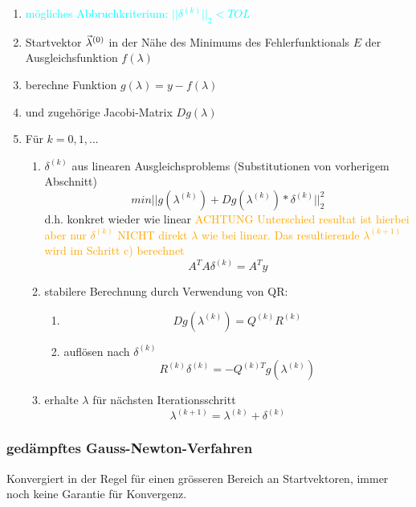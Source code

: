{\large
\begin{enumerate}
	\item[] \textcolor{cyan}{mögliches Abbruchkriterium: $||\delta^{(k)}||_2 < TOL$}
	\item Startvektor $\vec \lambda^{(0)}$ in der Nähe des Minimums des
	      Fehlerfunktionals $E$ der Ausgleichsfunktion $f(\lambda)$
	\item berechne Funktion $g(\lambda) = y - f(\lambda)$
	\item und zugehörige Jacobi-Matrix $Dg(\lambda)$
	\item Für $k = 0,1,...$
	      \begin{enumerate}
		      \item $\delta^{(k)}$ aus linearen Ausgleichsproblems (Substitutionen
		            von vorherigem Abschnitt)
		            $$min || g(\lambda^{(k)}) + Dg(\lambda^{(k)}) * \delta^{(k)} ||_2^2$$
		            d.h. konkret wieder wie linear \textcolor{orange}{ACHTUNG Unterschied
			            resultat ist hierbei aber nur $\delta^{(k)}$ NICHT direkt $\lambda$
			            wie bei linear. Das resultierende $\lambda^{(k+1)}$ wird im
			            Schritt c) berechnet}
		            $$A^T A \delta^{(k)} = A^T y$$

		      \item stabilere Berechnung durch Verwendung von QR:
		            \begin{enumerate}[series=gauss-newton-inner]
			            \item $$Dg(\lambda^{(k)}) = Q^{(k)} R^{(k)}$$
			            \item auflösen nach $\delta^{(k)}$
			                  $$R^{(k)} \delta^{(k)} = -Q^{(k) T} g(\lambda^{(k)})$$
		            \end{enumerate}
		      \item erhalte $\lambda$ für nächsten Iterationsschritt
		            $$\lambda^{(k+1)} = \lambda^{(k)} + \delta^{(k)}$$
	      \end{enumerate}
\end{enumerate}
}



\subsubsection{gedämpftes Gauss-Newton-Verfahren}

Konvergiert in der Regel für einen grösseren Bereich an Startvektoren, immer noch
keine Garantie für Konvergenz.

